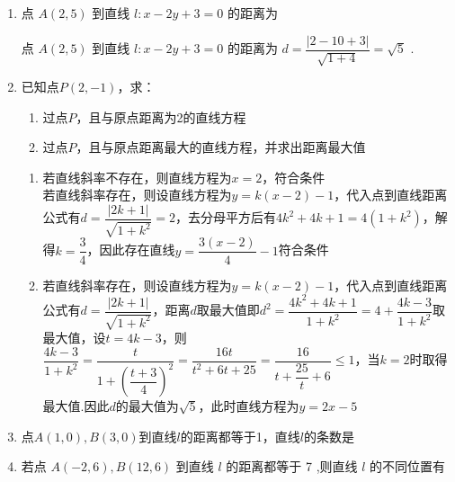 \begin{enumerate}
    \item 点 $A\left( {2,5}\right)$ 到直线 $l : x - {2y} + 3 = 0$ 的距离为
    \begin{jieda}
        点 $A\left( {2,5}\right)$ 到直线 $l : x - {2y} + 3 = 0$ 的距离为 $d = \dfrac{\left| 2 - {10} + 3\right| }{\sqrt{1 + 4}} = \sqrt{5}$ .
    \end{jieda}

    \item 已知点$P(2, -1)$，求：
    \begin{enumerate}
        \item 过点$P$，且与原点距离为2的直线方程
        \item 过点$P$，且与原点距离最大的直线方程，并求出距离最大值
    \end{enumerate}
    \begin{jieda}
        \begin{enumerate}
            \item 若直线斜率不存在，则直线方程为$x = 2$，符合条件 \\
            若直线斜率存在，则设直线方程为$y = k(x-2)-1$，代入点到直线距离公式有$d = \dfrac{|2k+1|}{\sqrt{1+k^2}} = 2$，去分母平方后有$4k^2+4k+1 = 4(1+k^2)$，解得$k = \dfrac{3}{4}$，因此存在直线$y = \dfrac{3(x-2)}{4}-1$符合条件
            \item 若直线斜率存在，则设直线方程为$y = k(x-2)-1$，代入点到直线距离公式有$d = \dfrac{|2k+1|}{\sqrt{1+k^2}}$，距离$d$取最大值即$d^2 = \dfrac{4k^2+4k+1}{1+k^2} = 4+\dfrac{4k-3}{1+k^2}$取最大值，设$t = 4k-3$，则$\dfrac{4k-3}{1+k^2} = \dfrac{t}{1+\left(\dfrac{t+3}{4}\right)^2} = \dfrac{16t}{t^2+6t+25} = \dfrac{16}{t+\dfrac{25}{t}+6} \leq 1$，当$k = 2$时取得最大值.因此$d$的最大值为$\sqrt{5}$，此时直线方程为$y = 2x - 5$
        \end{enumerate}
    \end{jieda}

    \item 点$A(1, 0), B(3, 0)$到直线$l$的距离都等于1，直线$l$的条数是
    
    \item 若点 $A\left( {-2,6}\right) ,B\left( {{12},6}\right)$ 到直线 $l$ 的距离都等于 7 ,则直线 $l$ 的不同位置有
    

\end{enumerate}
